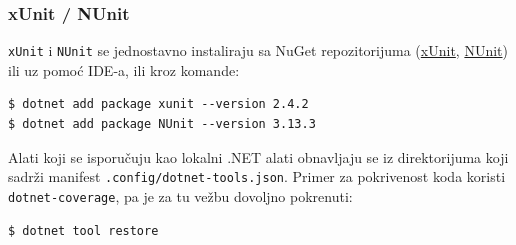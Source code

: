 \subsubsection{xUnit / NUnit}\label{xunit--nunit}

\texttt{xUnit} i \texttt{NUnit} se jednostavno instaliraju sa NuGet repozitorijuma (\href{https://www.nuget.org/packages/xUnit}{xUnit}, \href{https://www.nuget.org/packages/xUnit}{NUnit}) ili uz pomoć IDE-a, ili kroz komande:

\begin{verbatim}
$ dotnet add package xunit --version 2.4.2
$ dotnet add package NUnit --version 3.13.3
\end{verbatim}

Alati koji se isporučuju kao lokalni .NET alati obnavljaju se iz direktorijuma koji sadrži manifest \texttt{.config/dotnet-tools.json}. Primer za pokrivenost koda koristi \texttt{dotnet-coverage}, pa je za tu vežbu dovoljno pokrenuti:

\begin{verbatim}
$ dotnet tool restore
\end{verbatim}
